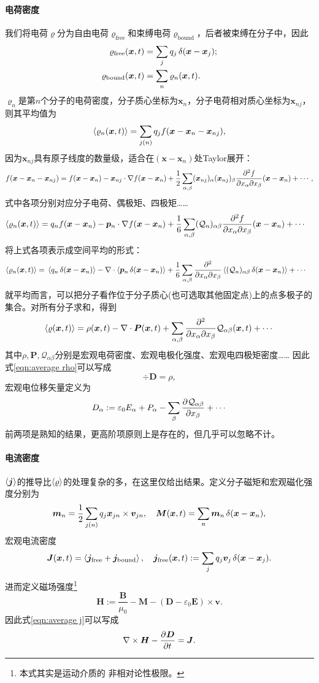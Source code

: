 \paragraph{电荷密度}
我们将电荷$\varrho$分为自由电荷$\varrho_\text{free}$和束缚电荷$\varrho_\text{bound}$，后者被束缚在分子中，因此
\begin{align*}
    \varrho_\text{free}(\bm x,t)&=\sum_jq_j\mathop{}\!\delta(\bm x-\bm x_j);\\
    \varrho_\text{bound}(\bm x,t)&=\sum_n\varrho_n(\bm x,t).
\end{align*}
$\varrho_n$是第$n$个分子的电荷密度，分子质心坐标为$\bm x_n$，分子电荷相对质心坐标为$\bm x_{nj}$，则其平均值为
\[
    \left\langle \varrho_n(\bm x,t)\right\rangle=\sum_{j(n)}q_jf(\bm x-\bm x_n-\bm x_{nj}),
\]
因为$\bm x_{nj}$具有原子线度的数量级，适合在$(\bm x-\bm x_n)$处Taylor展开： 
\[
    f(\bm x-\bm x_n-\bm x_{nj})=f(\bm x-\bm x_n)-\bm x_{nj}\cdot\nabla f(\bm x-\bm x_n)+\frac12\sum_{\alpha,\beta}(\bm x_{nj})_\alpha(\bm x_{nj})_\beta\frac{\partial^2{f}}{\partial{x_\alpha}\partial{x_\beta}}(\bm x-\bm x_n)+\cdots,
\]
式中各项分别对应分子电荷、偶极矩、四极矩……
\begin{align*}
    \left\langle \varrho_n(\bm x,t)\right\rangle={}&q_nf(\bm x-\bm x_n)-\bm p_n\cdot\nabla f(\bm x-\bm x_n)+\frac16\sum_{\alpha,\beta}(\mathcal Q_n)_{\alpha\beta}\frac{\partial^2{f}}{\partial{x_\alpha}\partial{x_\beta}}(\bm x-\bm x_n)+\cdots
\end{align*}
将上式各项表示成空间平均的形式：
\begin{align*}
    \left\langle \varrho_n(\bm x,t)\right\rangle={}&\left\langle q_n\mathop{}\!\delta(\bm x-\bm x_n)\right\rangle-\nabla\cdot\left\langle \bm p_n\mathop{}\!\delta(\bm x-\bm x_n)\right\rangle+\frac16\sum_{\alpha,\beta}\frac{\partial^2{}}{\partial{x_\alpha}\partial{x_\beta}}\left\langle (\mathcal Q_n)_{\alpha\beta}\mathop{}\!\delta(\bm x-\bm x_n)\right\rangle+\cdots
\end{align*}
就平均而言，可以把分子看作位于分子质心(也可选取其他固定点)上的点多极子的集合。对所有分子求和，得到
\[
    \left\langle \varrho(\bm x,t)\right\rangle=\rho(\bm x,t)-\nabla\cdot\bm P(\bm x,t)+\sum_{\alpha,\beta}\frac{\partial^2{}}{\partial{x_\alpha}\partial{x_\beta}}\mathcal Q_{\alpha\beta}(\bm x,t)+\cdots
\]
其中$\rho,\bm P,\mathcal Q_{\alpha\beta}$分别是宏观电荷密度、宏观电极化强度、宏观电四极矩密度……
因此式\eqref{eqn:average rho}可以写成 
\[
    \div\bm D=\rho,
\]
宏观电位移矢量定义为
\[
    D_\alpha:=\varepsilon_0E_\alpha+P_\alpha-\sum_\beta\frac{\partial^{{}}\mathcal Q_{\alpha\beta}}{\partial{x_\beta}^{{}}}+\cdots
\]
前两项是熟知的结果，更高阶项原则上是存在的，但几乎可以忽略不计。
\paragraph{电流密度}
$\left\langle \bm j\right\rangle$的推导比$\left\langle \varrho\right\rangle$的处理复杂的多，在这里仅给出结果。定义分子磁矩和宏观磁化强度分别为
\[
    \bm m_n=\frac12\sum_{j(n)}q_j\bm x_{jn}\times\bm v_{jn},\quad\bm M(\bm x,t)=\sum_n\bm m_n\mathop{}\!\delta(\bm x-\bm x_n),
\]
宏观电流密度
\[
    \bm J(\bm x,t)=\left\langle \bm j_\text{free}+\bm j_\text{bound}\right\rangle,\quad\bm j_\text{free}(\bm x,t):=\sum_jq_j\bm v_j\mathop{}\!\delta(\bm x-\bm x_j).
\]
进而定义磁场强度\footnote{本式其实是运动介质的%
非相对论性极限。}
\[
    \bm H:=\frac{\bm B}{\mu_0}-\bm M-(\bm D-\varepsilon_0\bm E)\times\bm v.
\]
因此式\eqref{eqn:average j}可以写成
\[
    \nabla\times\bm H-\frac{\partial^{{}}\bm D}{\partial{t}^{{}}}=\bm J.
\] 

